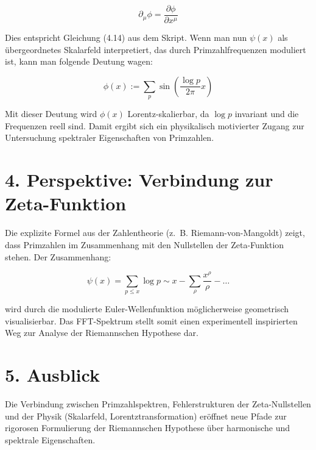 \documentclass[a4paper,12pt]{article}
\begin{document}
\[
\partial_\mu \phi = \frac{\partial \phi}{\partial x^\mu}
\]

Dies entspricht Gleichung (4.14) aus dem Skript. Wenn man nun \(\psi(x)\) als übergeordnetes Skalarfeld interpretiert, das durch Primzahlfrequenzen moduliert ist, kann man folgende Deutung wagen:

\[
\phi(x) := \sum_{p} \sin\left(\frac{\log p}{2\pi} x\right)
\]

Mit dieser Deutung wird \(\phi(x)\) Lorentz-skalierbar, da \(\log p\) invariant und die Frequenzen reell sind. Damit ergibt sich ein physikalisch motivierter Zugang zur Untersuchung spektraler Eigenschaften von Primzahlen.

\section*{4. Perspektive: Verbindung zur Zeta-Funktion}
Die explizite Formel aus der Zahlentheorie (z.~B. Riemann-von-Mangoldt) zeigt, dass Primzahlen im Zusammenhang mit den Nullstellen der Zeta-Funktion stehen. Der Zusammenhang:

\[
\psi(x) = \sum_{p \leq x} \log p \sim x - \sum_{\rho} \frac{x^\rho}{\rho} - \dots
\]

wird durch die modulierte Euler-Wellenfunktion möglicherweise geometrisch visualisierbar. Das FFT-Spektrum stellt somit einen experimentell inspirierten Weg zur Analyse der Riemannschen Hypothese dar.

\section*{5. Ausblick}
Die Verbindung zwischen Primzahlspektren, Fehlerstrukturen der Zeta-Nullstellen und der Physik (Skalarfeld, Lorentztransformation) eröffnet neue Pfade zur rigorosen Formulierung der Riemannschen Hypothese über harmonische und spektrale Eigenschaften.
\end{document}

